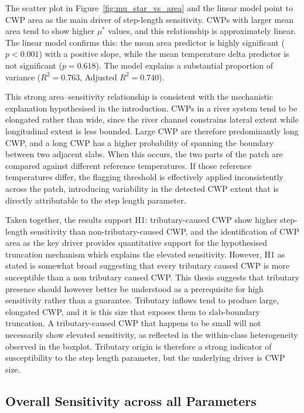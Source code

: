 The scatter plot in Figure~\ref{fig:mu_star_vs_area} and the linear model 
point to CWP area as the main driver of step-length sensitivity. CWPs 
with larger mean area tend to show higher $\mu^*$ values, and this relationship 
is approximately linear. The linear model confirms this: the mean area predictor 
is highly significant ($p < 0.001$) with a positive slope, while the mean 
temperature delta predictor is not significant ($p = 0.618$). The model explains 
a substantial proportion of variance ($R^2 = 0.763$, Adjusted $R^2 = 0.740$).

This strong area--sensitivity relationship is consistent with the mechanistic 
explanation hypothesised in the introduction. CWPs in a river system tend to 
be elongated rather than wide, since the river channel constrains lateral extent 
while longitudinal extent is less bounded. Large CWP are therefore predominantly 
long CWP, and a long CWP has a higher probability of spanning the boundary 
between two adjacent slabs. When this occurs, the two parts of the patch are 
compared against different reference temperatures. If those reference temperatures differ, the flagging 
threshold is effectively applied inconsistently across the patch, introducing 
variability in the detected CWP extent that is directly attributable to the 
step length parameter. 

Taken together, the results support H1: tributary-caused CWP show higher 
step-length sensitivity than non-tributary-caused CWP, and the identification 
of CWP area as the key driver provides quantitative support for the hypothesised 
truncation mechanism which explains the elevated sensitivity. However, H1 as stated is somewhat broad suggesting that every tributary caused CWP is more succeptible than a non tributary caused CWP. This thesis suggests that 
tributary presence should however better be understood as a prerequisite for high sensitivity rather than 
a guarantee. Tributary inflows tend to produce large, elongated CWP, and it is 
this size that exposes them to slab-boundary truncation. A tributary-caused CWP 
that happens to be small will not necessarily show elevated sensitivity, as 
reflected in the within-class heterogeneity observed in the boxplot. Tributary 
origin is therefore a strong indicator of susceptibility to the step length 
parameter, but the underlying driver is CWP size.





\subsection{Overall Sensitivity across all Parameters}



